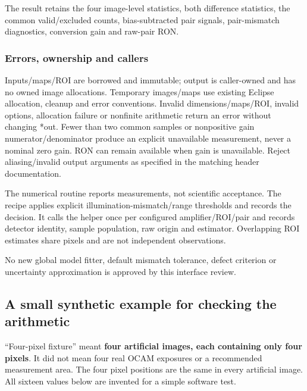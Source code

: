 \documentclass[
  10pt,
  a4paper,
]{article}
\begin{document}
The result retains the four image-level statistics, both difference
statistics, the common valid/excluded counts, bias-subtracted pair
signals, pair-mismatch diagnostics, conversion gain and raw-pair RON.

\hypertarget{errors-ownership-and-callers}{%
\subsubsection{Errors, ownership and
callers}\label{errors-ownership-and-callers}}

Inputs/maps/ROI are borrowed and immutable; output is caller-owned and
has no owned image allocations. Temporary images/maps use existing
Eclipse allocation, cleanup and error conventions. Invalid
dimensions/maps/ROI, invalid options, allocation failure or nonfinite
arithmetic return an error without changing *out. Fewer than two common
samples or nonpositive gain numerator/denominator produce an explicit
unavailable measurement, never a nominal zero gain. RON can remain
available when gain is unavailable. Reject aliasing/invalid output
arguments as specified in the matching header documentation.

The numerical routine reports measurements, not scientific acceptance.
The recipe applies explicit illumination-mismatch/range thresholds and
records the decision. It calls the helper once per configured
amplifier/ROI/pair and records detector identity, sample population, raw
origin and estimator. Overlapping ROI estimates share pixels and are not
independent observations.

No new global model fitter, default mismatch tolerance, defect criterion
or uncertainty approximation is approved by this interface review.

\hypertarget{a-small-synthetic-example-for-checking-the-arithmetic}{%
\subsection{A small synthetic example for checking the
arithmetic}\label{a-small-synthetic-example-for-checking-the-arithmetic}}

``Four-pixel fixture'' meant \textbf{four artificial images, each
containing only four pixels}. It did not mean four real OCAM exposures
or a recommended measurement area. The four pixel positions are the same
in every artificial image. All sixteen values below are invented for a
simple software test.
\end{document}
